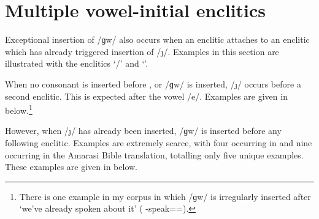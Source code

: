 \section{Multiple vowel-initial enclitics}\label{sec:ConInsConIns}
Exceptional insertion of /ɡw/ also
occurs when an enclitic attaches to an enclitic which has
already triggered insertion of /\j/.
Examples in this section are illustrated with 
the enclitics  `{\ee}/{\eeV}' and  `{\een}'.

When no consonant is inserted before , or /ɡw/ is inserted,
/\j/ occurs before a second enclitic.
This is expected after the vowel /e/.
Examples are given in  below.\footnote{
		There is one example in my corpus in which /ɡw/
		is irregularly inserted after  
		`we've already spoken about it' ({\hai} \mi-speak={\ee=\een}).}

\begin{exe}
\end{exe}

However, when /\j/ has already been inserted,
/ɡw/ is inserted before any following enclitic.
Examples are extremely scarce, with four occurring in
\citet{or16c} and nine occurring in the Amarasi Bible translation,
totalling only five unique examples.
These examples are given in  below.

